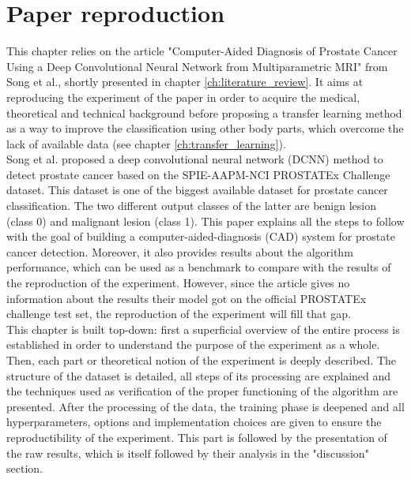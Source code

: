 
\chapter{Paper reproduction}
\label{ch:paper_reproduction}
This chapter relies on the article "Computer-Aided Diagnosis of Prostate Cancer Using a Deep Convolutional Neural Network from Multiparametric MRI" from Song et al.\cite{07}, shortly presented in chapter \ref{ch:literature_review}. It aims at reproducing the experiment of the paper in order to acquire the medical, theoretical and technical background before proposing a transfer learning method as a way to improve the classification using other body parts, which overcome the lack of available data (see chapter \ref{ch:transfer_learning}).\\
Song et al. \cite{07} proposed a deep convolutional neural network (DCNN) method to detect prostate cancer based on the SPIE-AAPM-NCI PROSTATEx Challenge dataset. This dataset is one of the biggest available dataset for prostate cancer classification. The two different output classes of the latter are benign lesion (class 0) and malignant lesion (class 1). This paper explains all the steps to follow with the goal of building a computer-aided-diagnosis (CAD) system for prostate cancer detection. Moreover, it also provides results about the algorithm performance, which can be used as a benchmark to compare with the results of the reproduction of the experiment. However, since the article gives no information about the results their model got on the official PROSTATEx challenge test set, the reproduction of the experiment will fill that gap.\\
This chapter is built top-down: first a superficial overview of the entire process is established in order to understand the purpose of the experiment as a whole. Then, each part or theoretical notion of the experiment is deeply described. The structure of the dataset is detailed, all steps of its processing are explained and the techniques used as verification of the proper functioning of the algorithm are presented. After the processing of the data, the training phase is deepened and all hyperparameters, options and implementation choices are given to ensure the reproductibility of the experiment. This part is followed by the presentation of the raw results, which is itself followed by their analysis in the "discussion" section.

